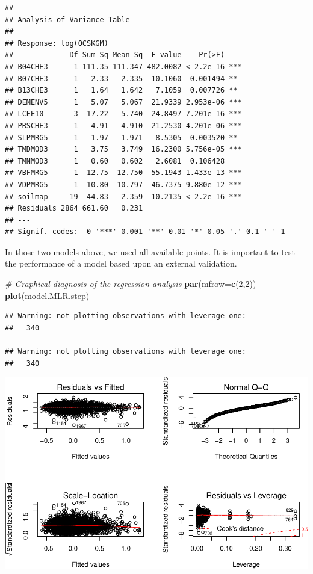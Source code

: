 \documentclass[10pt,b5paper,]{book}
\newenvironment{Shaded}{\begin{snugshade}}{\end{snugshade}}
\newcommand{\CommentTok}[1]{\textcolor[rgb]{0.56,0.35,0.01}{\textit{#1}}}
\newcommand{\DataTypeTok}[1]{\textcolor[rgb]{0.13,0.29,0.53}{#1}}
\newcommand{\DecValTok}[1]{\textcolor[rgb]{0.00,0.00,0.81}{#1}}
\newcommand{\KeywordTok}[1]{\textcolor[rgb]{0.13,0.29,0.53}{\textbf{#1}}}
\newcommand{\NormalTok}[1]{#1}
\theoremstyle{definition}
\theoremstyle{definition}
\theoremstyle{definition}
\theoremstyle{remark}
\begin{document}
\begin{verbatim}
## 
## Analysis of Variance Table
## 
## Response: log(OCSKGM)
##             Df Sum Sq Mean Sq  F value    Pr(>F)    
## B04CHE3      1 111.35 111.347 482.0082 < 2.2e-16 ***
## B07CHE3      1   2.33   2.335  10.1060  0.001494 ** 
## B13CHE3      1   1.64   1.642   7.1059  0.007726 ** 
## DEMENV5      1   5.07   5.067  21.9339 2.953e-06 ***
## LCEE10       3  17.22   5.740  24.8497 7.201e-16 ***
## PRSCHE3      1   4.91   4.910  21.2530 4.201e-06 ***
## SLPMRG5      1   1.97   1.971   8.5305  0.003520 ** 
## TMDMOD3      1   3.75   3.749  16.2300 5.756e-05 ***
## TMNMOD3      1   0.60   0.602   2.6081  0.106428    
## VBFMRG5      1  12.75  12.750  55.1943 1.433e-13 ***
## VDPMRG5      1  10.80  10.797  46.7375 9.880e-12 ***
## soilmap     19  44.83   2.359  10.2135 < 2.2e-16 ***
## Residuals 2864 661.60   0.231                       
## ---
## Signif. codes:  0 '***' 0.001 '**' 0.01 '*' 0.05 '.' 0.1 ' ' 1
\end{verbatim}

In those two models above, we used all available points. It is important
to test the performance of a model based upon an external validation.

\begin{Shaded}
\begin{Highlighting}[]
\CommentTok{# Graphical diagnosis of the regression analysis}
\KeywordTok{par}\NormalTok{(}\DataTypeTok{mfrow=}\KeywordTok{c}\NormalTok{(}\DecValTok{2}\NormalTok{,}\DecValTok{2}\NormalTok{))}
\KeywordTok{plot}\NormalTok{(model.MLR.step)}
\end{Highlighting}
\end{Shaded}

\begin{verbatim}
## Warning: not plotting observations with leverage one:
##   340

## Warning: not plotting observations with leverage one:
##   340
\end{verbatim}

\includegraphics{SOCMapping_files/figure-latex/unnamed-chunk-42-1.pdf}
\end{document}
